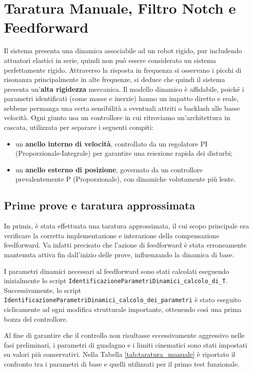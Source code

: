 \documentclass{article}
\begin{document}
\section{Taratura Manuale, Filtro Notch e Feedforward}
Il sistema presenta una dinamica associabile ad un robot rigido, pur includendo attuatori elastici in serie,
 quindi non può essere considerato un sistema perfettamente rigido. 
Attraverso la risposta in frequenza si osservano i picchi di risonanza principalmente 
in alte frequenze, si deduce che quindi il sistema presenta un'\textbf{alta rigidezza} meccanica. 
Il modello dinamico è affidabile, poiché i parametri identificati 
(come masse e inerzie) hanno un impatto diretto e reale, sebbene permanga una certa sensibilità a 
eventuali attriti o backlash alle basse velocità.
Ogni giunto usa un controllore in cui ritroviamo un'architettura in cascata, 
utilizzata per separare i seguenti compiti:
\begin{itemize}
    \item un \textbf{anello interno di velocità}, controllato da un regolatore PI (Proporzionale-Integrale) per garantire una reiezione rapida dei disturbi;
    \item un \textbf{anello esterno di posizione}, governato da un controllore prevalentemente P (Proporzionale), con dinamiche volutamente più lente.
\end{itemize}

\subsection*{Prime prove e taratura approssimata}
In primis, è stata effettuata una taratura approssimata, il cui scopo principale era verificare la corretta 
implementazione e interazione della compensazione feedforward. Va infatti precisato che l'azione di feedforward 
è stata erroneamente mantenuta attiva fin dall'inizio delle prove, influenzando la dinamica di base.

I parametri dinamici necessari al feedforward sono stati calcolati eseguendo inizialmente lo script \newline
\texttt{IdentificazioneParametriDinamici\_calcolo\_di\_T}. \newline
Successivamente, lo script \texttt{IdentificazioneParametriDinamici\_calcolo\_dei\_parametri} è stato eseguito ciclicamente ad ogni modifica strutturale importante, ottenendo così una prima bozza del controllore.

Al fine di garantire che il controllo non risultasse eccessivamente aggressivo nelle fasi preliminari, i parametri 
di guadagno e i limiti cinematici sono stati impostati su valori più conservativi. 
Nella Tabella \ref{tab:taratura_manuale} è riportato il confronto tra i parametri di base e quelli utilizzati 
per il primo test funzionale.
\end{document}
